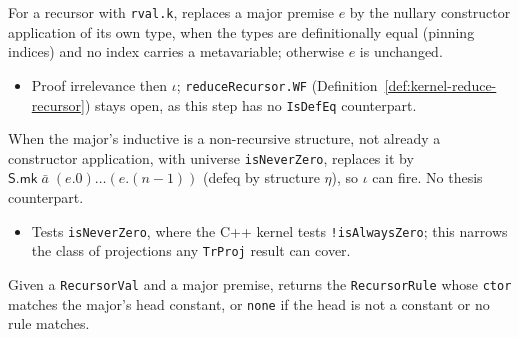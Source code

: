 \begin{definition}
\label{def:kernel-to-ctor-when-k}
\leanok
{}

 For a recursor with \texttt{rval.k}, replaces a major premise $e$ by the nullary
constructor application of its own type, when the types are definitionally equal (pinning indices)
and no index carries a metavariable; otherwise $e$ is unchanged.
\begin{itemize}
\item {} Proof irrelevance then $\iota$; \texttt{reduceRecursor.WF}
(Definition~\ref{def:kernel-reduce-recursor}) stays open, as this step has no \texttt{IsDefEq}
counterpart.
\end{itemize}
\end{definition}

\begin{definition}
\label{def:kernel-to-ctor-when-struct}
\leanok
{}
 When the major's inductive is a non-recursive structure, not already a constructor
application, with universe \texttt{isNeverZero}, replaces it by $\mathsf{S.mk}\;\bar
a\;(e.0)\dots(e.(n{-}1))$ (defeq by structure $\eta$), so $\iota$ can fire. No thesis counterpart.
\begin{itemize}
\item {} Tests \texttt{isNeverZero}, where the C++ kernel tests
\texttt{!isAlwaysZero}; this narrows the class of projections any \texttt{TrProj} result can
cover.
\end{itemize}
\end{definition}

\begin{definition}
\label{def:kernel-get-rec-rule-for}
\leanok
{}

 Given a \texttt{RecursorVal} and a major premise, returns the
\texttt{RecursorRule} whose \texttt{ctor} matches the major's head constant, or \texttt{none} if
the head is not a constant or no rule matches.
\end{definition}


